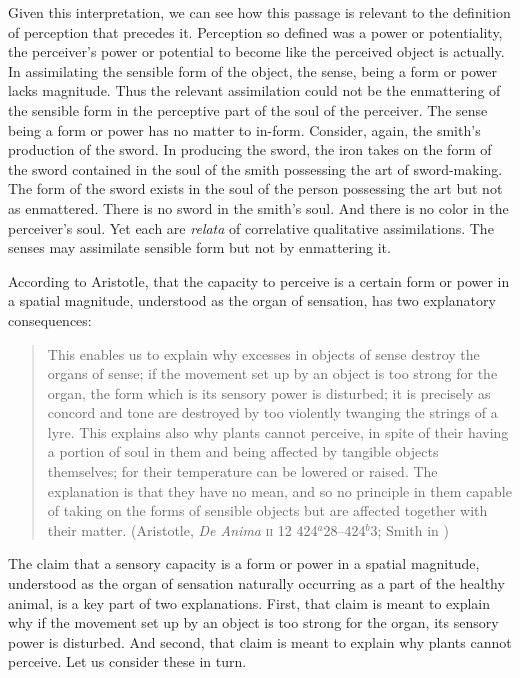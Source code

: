 Given this interpretation, we can see how this passage is relevant to the definition of perception that precedes it. Perception so defined was a power or potentiality, the perceiver's power or potential to become like the perceived object is actually. In assimilating the sensible form of the object, the sense, being a form or power lacks magnitude. Thus the relevant assimilation could not be the enmattering of the sensible form in the perceptive part of the soul of the perceiver. The sense being a form or power has no matter to in-form. Consider, again, the smith's production of the sword. In producing the sword, the iron takes on the form of the sword contained in the soul of the smith possessing the art of sword-making. The form of the sword exists in the soul of the person possessing the art but not as enmattered. There is no sword in the smith's soul. And there is no color in the perceiver's soul. Yet each are \emph{relata} of correlative qualitative assimilations. The senses may assimilate sensible form but not by enmattering it.

According to Aristotle, that the capacity to perceive is a certain form or power in a spatial magnitude, understood as the organ of sensation, has two explanatory consequences:
\begin{quote}
	This enables us to explain why excesses in objects of sense destroy the organs of sense; if the movement set up by an object is too strong for the organ, the form which is its sensory power is disturbed; it is precisely as concord and tone are destroyed by too violently twanging the strings of a lyre. This explains also why plants cannot perceive, in spite of their having a portion of soul in them and being affected by tangible objects themselves; for their temperature can be lowered or raised. The explanation is that they have no mean, and so no principle in them capable of taking on the forms of sensible objects but are affected together with their matter. (Aristotle, \emph{De Anima} \textsc{ii} 12 424\( ^{a} \)28--424\( ^{b} \)3; Smith in \citealt[43]{Barnes:1984uq})
\end{quote}
The claim that a sensory capacity is a form or power in a spatial magnitude, understood as the organ of sensation naturally occurring as a part of the healthy animal, is a key part of two explanations. First, that claim is meant to explain why if the movement set up by an object is too strong for the organ, its sensory power is disturbed. And second, that claim is meant to explain why plants cannot perceive. Let us consider these in turn.

